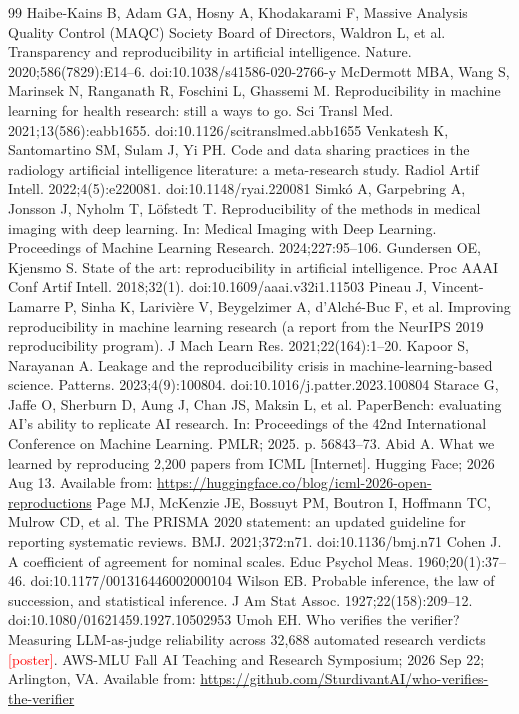 \documentclass[11pt]{article}
\newcommand{\todo}[1]{\textcolor{red}{#1}}
\begin{document}
\clearpage
\begin{thebibliography}{99}
 Haibe-Kains B, Adam GA, Hosny A, Khodakarami F, Massive Analysis Quality Control (MAQC) Society Board of Directors, Waldron L, et al. Transparency and reproducibility in artificial intelligence. Nature. 2020;586(7829):E14–6. doi:10.1038/s41586-020-2766-y
 McDermott MBA, Wang S, Marinsek N, Ranganath R, Foschini L, Ghassemi M. Reproducibility in machine learning for health research: still a ways to go. Sci Transl Med. 2021;13(586):eabb1655. doi:10.1126/scitranslmed.abb1655
 Venkatesh K, Santomartino SM, Sulam J, Yi PH. Code and data sharing practices in the radiology artificial intelligence literature: a meta-research study. Radiol Artif Intell. 2022;4(5):e220081. doi:10.1148/ryai.220081
 Simkó A, Garpebring A, Jonsson J, Nyholm T, Löfstedt T. Reproducibility of the methods in medical imaging with deep learning. In: Medical Imaging with Deep Learning. Proceedings of Machine Learning Research. 2024;227:95–106.
 Gundersen OE, Kjensmo S. State of the art: reproducibility in artificial intelligence. Proc AAAI Conf Artif Intell. 2018;32(1). doi:10.1609/aaai.v32i1.11503
 Pineau J, Vincent-Lamarre P, Sinha K, Larivière V, Beygelzimer A, d'Alché-Buc F, et al. Improving reproducibility in machine learning research (a report from the NeurIPS 2019 reproducibility program). J Mach Learn Res. 2021;22(164):1–20.
 Kapoor S, Narayanan A. Leakage and the reproducibility crisis in machine-learning-based science. Patterns. 2023;4(9):100804. doi:10.1016/j.patter.2023.100804
 Starace G, Jaffe O, Sherburn D, Aung J, Chan JS, Maksin L, et al. PaperBench: evaluating AI's ability to replicate AI research. In: Proceedings of the 42nd International Conference on Machine Learning. PMLR; 2025. p. 56843–73.
 Abid A. What we learned by reproducing 2,200 papers from ICML [Internet]. Hugging Face; 2026 Aug 13. Available from: \url{https://huggingface.co/blog/icml-2026-open-reproductions}
 Page MJ, McKenzie JE, Bossuyt PM, Boutron I, Hoffmann TC, Mulrow CD, et al. The PRISMA 2020 statement: an updated guideline for reporting systematic reviews. BMJ. 2021;372:n71. doi:10.1136/bmj.n71
 Cohen J. A coefficient of agreement for nominal scales. Educ Psychol Meas. 1960;20(1):37–46. doi:10.1177/001316446002000104
 Wilson EB. Probable inference, the law of succession, and statistical inference. J Am Stat Assoc. 1927;22(158):209–12. doi:10.1080/01621459.1927.10502953
 Umoh EH. Who verifies the verifier? Measuring LLM-as-judge reliability across 32,688 automated research verdicts \todo{[poster]}. AWS-MLU Fall AI Teaching and Research Symposium; 2026 Sep 22; Arlington, VA. Available from: \url{https://github.com/SturdivantAI/who-verifies-the-verifier}

\end{thebibliography}
\end{document}
